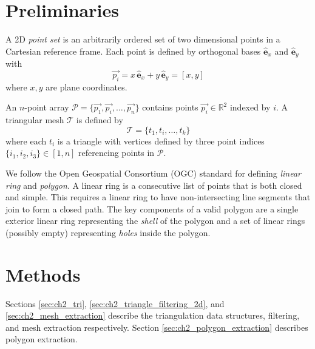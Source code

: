\section{Preliminaries}\label{sec:ch2_prelim}

A 2D \textit{point set} is an arbitrarily ordered set of two dimensional points in a Cartesian reference frame. Each point is defined by orthogonal bases $\hat{\mathbf{e}}_x$ and $\hat{\mathbf{e}}_y$  with
\begin{equation}
\label{eq:point}
    \vec{{p}_{i}}=x\,\hat{\mathbf{e}}_x+y\, \hat{\mathbf{e}}_y= [x,y]
\end{equation}
where $x,y$ are plane coordinates.

An $n$-point array $\mathcal{P} = \{ \vec{{p}_{1}}, \vec{{p}_{i}}, \ldots, \vec{{p}_{n}} \}$ contains points $\vec{{p}_{i}} \in \mathbb{R}^2$ indexed by $i$.  A triangular mesh $ \mathcal{T}$ is defined by
\begin{equation}
\label{eq:ch2_tri}
    \mathcal{T} = \{ t_1, t_i, \ldots, t_{k} \}
\end{equation}
where each $t_i$ is a triangle with vertices defined by three point indices $\{i_1, i_2, i_3\} \in \left[1,n\right]$ referencing points in $\mathcal{P}$.

We follow the Open Geospatial Consortium (OGC) standard \cite{herring_opengis_2006-1} for defining \textit{linear ring} and \textit{polygon}. A linear ring is a consecutive list of points that is both closed and simple. This requires a linear ring to have non-intersecting line segments that join to form a closed path. The key components of a valid polygon are a single exterior linear ring representing the \emph{shell} of the polygon and a set of linear rings (possibly empty) representing \emph{holes} inside the polygon. 

\section{Methods}\label{sec:ch2_methods}

Sections \ref{sec:ch2_tri}, \ref{sec:ch2_triangle_filtering_2d}, and \ref{sec:ch2_mesh_extraction} describe the triangulation data structures, filtering, and mesh extraction respectively.  Section \ref{sec:ch2_polygon_extraction} describes polygon extraction. %
